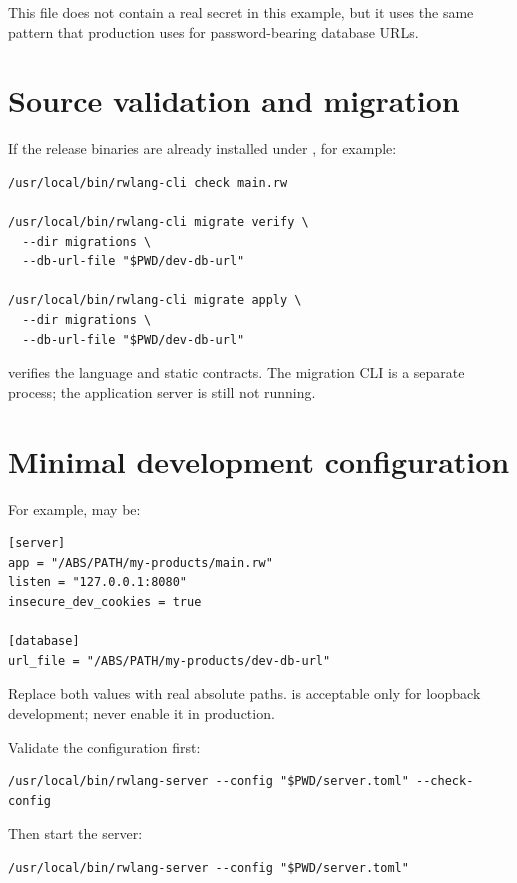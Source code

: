 This file does not contain a real secret in this example, but it uses the same  pattern that production uses for password-bearing database URLs.

\section{Source validation and migration}

If the release binaries are already installed under , for example:

\begin{lstlisting}
/usr/local/bin/rwlang-cli check main.rw

/usr/local/bin/rwlang-cli migrate verify \
  --dir migrations \
  --db-url-file "$PWD/dev-db-url"

/usr/local/bin/rwlang-cli migrate apply \
  --dir migrations \
  --db-url-file "$PWD/dev-db-url"
\end{lstlisting}

\code{check} verifies the language and static contracts. The migration CLI is a separate process; the application server is still not running.

\section{Minimal development configuration}

For example, \code{server.toml} may be:

\begin{lstlisting}
[server]
app = "/ABS/PATH/my-products/main.rw"
listen = "127.0.0.1:8080"
insecure_dev_cookies = true

[database]
url_file = "/ABS/PATH/my-products/dev-db-url"
\end{lstlisting}

Replace both  values with real absolute paths.  is acceptable only for loopback development; never enable it in production.

Validate the configuration first:

\begin{lstlisting}
/usr/local/bin/rwlang-server --config "$PWD/server.toml" --check-config
\end{lstlisting}

Then start the server:

\begin{lstlisting}
/usr/local/bin/rwlang-server --config "$PWD/server.toml"
\end{lstlisting}

